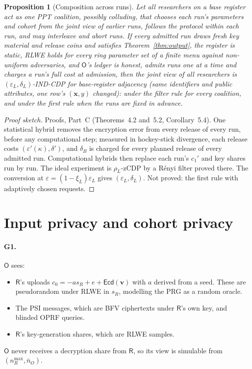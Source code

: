 \documentclass[11pt]{article}
\theoremstyle{definition}
\theoremstyle{plain}
\newtheorem{proposition}{Proposition}
\newcommand{\Rp}{\mathsf{R}}
\newcommand{\Op}{\mathsf{O}}
\newcommand{\Ecd}{\mathsf{Ecd}}
\newcommand{\bx}{\mathbf{x}}
\begin{document}
\begin{proposition}[Composition across runs]\label{prop:compose}
Let all researchers on a base register act as one PPT coalition, possibly colluding, that chooses each run's parameters and cohort from the joint view of earlier runs, follows the protocol within each run, and may interleave and abort runs. If every admitted run draws fresh key material and release coins and satisfies Theorem~\ref{thm:output}, the register is static, RLWE holds for every ring parameter set of a finite menu against non-uniform adversaries, and $\Op$'s ledger is honest, admits runs one at a time and charges a run's full cost at admission, then the joint view of all researchers is $(\varepsilon_L,\delta_L)$-IND-CDP for base-register adjacency (same identifiers and public attributes, one row's $(\bx,y)$ changed): under the filter rule for every coalition, and under the first rule when the runs are fixed in advance.
\end{proposition}
\begin{proof}[Proof sketch]
Proofs, Part~C (Theorems~4.2 and~5.2, Corollary~5.4). One statistical hybrid removes the encryption error from every release of every run, before any computational step; measured in hockey-stick divergence, each release costs $(\varepsilon'(\kappa),\delta')$, and $\delta_B$ is charged for every planned release of every admitted run. Computational hybrids then replace each run's $c_1'$ and key shares run by run. The ideal experiment is $\rho_L$-zCDP by a R\'enyi filter proved there. The conversion at $\varepsilon=(1-\xi_L)\varepsilon_L$ gives $(\varepsilon_L,\delta_L)$. Not proved: the first rule with adaptively chosen requests.
\end{proof}

\section{Input privacy and cohort privacy}

\paragraph{G1.} $\Op$ sees:
\begin{itemize}[nosep]
  \item $\Rp$'s uploads $c_0=-as_R+e+\Ecd(\mathbf v)$ with $a$ derived from a seed. These are pseudorandom under RLWE in $s_R$, modelling the PRG as a random oracle.
  \item The PSI messages, which are BFV ciphertexts under $\Rp$'s own key, and blinded OPRF queries.
  \item $\Rp$'s key-generation shares, which are RLWE samples.
\end{itemize}
$\Op$ never receives a decryption share from $\Rp$, so its view is simulable from $(n_R^{\max},\bar n_O)$.
\end{document}
